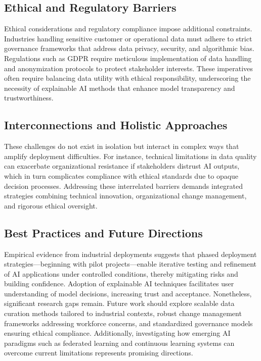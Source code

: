 \documentclass[sigconf]{acmart}
\begin{document}
\subsection{Ethical and Regulatory Barriers}

Ethical considerations and regulatory compliance impose additional constraints. Industries handling sensitive customer or operational data must adhere to strict governance frameworks that address data privacy, security, and algorithmic bias. Regulations such as GDPR require meticulous implementation of data handling and anonymization protocols to protect stakeholder interests. These imperatives often require balancing data utility with ethical responsibility, underscoring the necessity of explainable AI methods that enhance model transparency and trustworthiness.

\subsection{Interconnections and Holistic Approaches}

These challenges do not exist in isolation but interact in complex ways that amplify deployment difficulties. For instance, technical limitations in data quality can exacerbate organizational resistance if stakeholders distrust AI outputs, which in turn complicates compliance with ethical standards due to opaque decision processes. Addressing these interrelated barriers demands integrated strategies combining technical innovation, organizational change management, and rigorous ethical oversight.

\subsection{Best Practices and Future Directions}

Empirical evidence from industrial deployments suggests that phased deployment strategies—beginning with pilot projects—enable iterative testing and refinement of AI applications under controlled conditions, thereby mitigating risks and building confidence. Adoption of explainable AI techniques facilitates user understanding of model decisions, increasing trust and acceptance. Nonetheless, significant research gaps remain. Future work should explore scalable data curation methods tailored to industrial contexts, robust change management frameworks addressing workforce concerns, and standardized governance models ensuring ethical compliance. Additionally, investigating how emerging AI paradigms such as federated learning and continuous learning systems can overcome current limitations represents promising directions.
\end{document}
